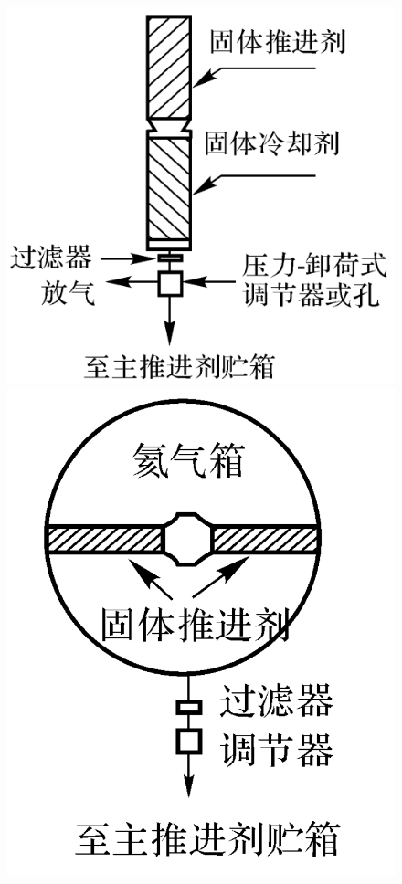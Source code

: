 \begin{enumerate}[\hspace*{1.5em} (1) ]
\begin{enumerate}
\begin{figure}[!htb]
\begin{minipage}{0.25\linewidth}
		\end{minipage}
		\begin{minipage}{0.25\linewidth}
			\centering
			\includegraphics[width=\linewidth]{pic/固体3.png}
		\end{minipage}
		\begin{minipage}{0.20\linewidth}
			\centering
			\includegraphics[width=\linewidth]{pic/固体4.png}

\end{minipage}
\end{figure}
\end{enumerate}
\end{enumerate}
